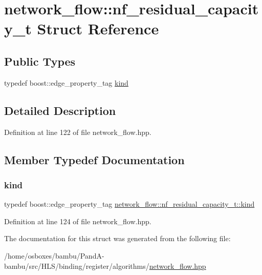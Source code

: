 \hypertarget{structnetwork__flow_1_1nf__residual__capacity__t}{}\section{network\+\_\+flow\+:\+:nf\+\_\+residual\+\_\+capacity\+\_\+t Struct Reference}
\label{structnetwork__flow_1_1nf__residual__capacity__t}
\subsection*{Public Types}
\begin{DoxyCompactItemize}
\item 
typedef boost\+::edge\+\_\+property\+\_\+tag \hyperlink{structnetwork__flow_1_1nf__residual__capacity__t_ab94a1cea5a6b9eb5cd7cb3173a2719d1}{kind}
\end{DoxyCompactItemize}


\subsection{Detailed Description}


Definition at line 122 of file network\+\_\+flow.\+hpp.



\subsection{Member Typedef Documentation}
\mbox{\label{structnetwork__flow_1_1nf__residual__capacity__t_ab94a1cea5a6b9eb5cd7cb3173a2719d1}} 
\subsubsection{\texorpdfstring{kind}{kind}}
{\footnotesize\ttfamily typedef boost\+::edge\+\_\+property\+\_\+tag \hyperlink{structnetwork__flow_1_1nf__residual__capacity__t_ab94a1cea5a6b9eb5cd7cb3173a2719d1}{network\+\_\+flow\+::nf\+\_\+residual\+\_\+capacity\+\_\+t\+::kind}}



Definition at line 124 of file network\+\_\+flow.\+hpp.



The documentation for this struct was generated from the following file\+:\begin{DoxyCompactItemize}
\item 
/home/osboxes/bambu/\+Pand\+A-\/bambu/src/\+H\+L\+S/binding/register/algorithms/\hyperlink{network__flow_8hpp}{network\+\_\+flow.\+hpp}\end{DoxyCompactItemize}
